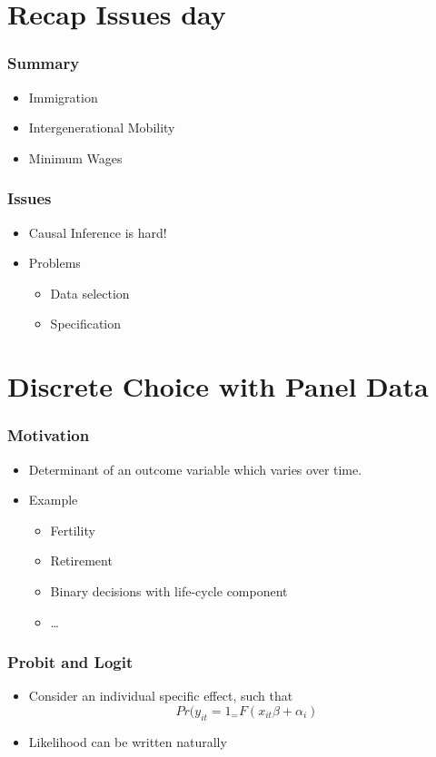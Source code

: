 \documentclass{beamer}
\newcommand{\1}{\mathbb{1}}
\begin{document}
\section{Recap Issues day}

\begin{frame}\frametitle{Summary}
\begin{itemize}
\item Immigration
\item Intergenerational Mobility
\item Minimum Wages
\end{itemize}
\end{frame}

\begin{frame}\frametitle{Issues}
\begin{itemize}
\item Causal Inference is hard!
\item Problems
\begin{itemize}
\item Data selection
\item Specification
\end{itemize}
\end{itemize}
\end{frame}


\section{Discrete Choice with Panel Data}

\begin{frame}\frametitle{Motivation}
\begin{itemize}
\item Determinant of an outcome variable which varies over time.
\item Example
\begin{itemize}
\item Fertility 
\item Retirement
\item Binary decisions with life-cycle component
\item \ldots
\end{itemize}
\end{itemize}
\end{frame}

\begin{frame}\frametitle{Probit and Logit}
\begin{itemize}
\item Consider an individual specific effect, such that 
\begin{equation}
Pr(y_{it}=1_ = F(x_{it} \beta + \alpha_i)
\end{equation}
\item Likelihood can be written naturally
\end{itemize}
\end{frame}
\end{document}
